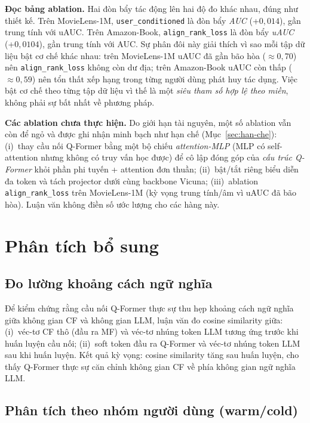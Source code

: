 \textbf{Đọc bảng ablation.} Hai đòn bẩy tác động lên hai độ đo khác nhau, đúng như thiết kế.
Trên MovieLens-1M, \texttt{user\_conditioned} là đòn bẩy \textit{AUC} (+$0{,}014$), gần trung
tính với uAUC. Trên Amazon-Book, \texttt{align\_rank\_loss} là đòn bẩy \textit{uAUC}
(+$0{,}0104$), gần trung tính với AUC. Sự phân đôi này giải thích vì sao mỗi tập dữ liệu bật
cơ chế khác nhau: trên MovieLens-1M uAUC đã gần bão hòa ($\approx 0{,}70$) nên
\texttt{align\_rank\_loss} không còn dư địa; trên Amazon-Book uAUC còn thấp ($\approx 0{,}59$)
nên tổn thất xếp hạng trong từng người dùng phát huy tác dụng. Việc bật cơ chế theo từng tập dữ
liệu vì thế là một \textit{siêu tham số hợp lệ theo miền}, không phải sự bất nhất về
phương pháp.

\textbf{Các ablation chưa thực hiện.} Do giới hạn tài nguyên, một số ablation vẫn còn để
ngỏ và được ghi nhận minh bạch như hạn chế (Mục~\ref{sec:han-che}): (i)~thay cầu nối Q-Former
bằng một bộ chiếu \textit{attention-MLP} (MLP có self-attention nhưng không có truy vấn học
được) để cô lập đóng góp của \textit{cấu trúc Q-Former} khỏi phần phi tuyến + attention đơn
thuần; (ii)~bật/tắt riêng biểu diễn đa token và tách projector dưới cùng backbone Vicuna;
(iii)~ablation \texttt{align\_rank\_loss} trên MovieLens-1M (kỳ
vọng trung tính/âm vì uAUC đã bão hòa). Luận văn không điền số ước lượng cho các hàng này.

\section{Phân tích bổ sung}
\label{sec:phan-tich-bo-sung}

\subsection{Đo lường khoảng cách ngữ nghĩa}
\label{ssec:cosine-sim}

Để kiểm chứng rằng cầu nối Q-Former thực sự thu hẹp khoảng cách ngữ nghĩa giữa không
gian CF và không gian LLM, luận văn đo cosine similarity giữa:
(i)~véc-tơ CF thô (đầu ra MF) và véc-tơ nhúng token LLM tương ứng trước khi huấn luyện
cầu nối; (ii)~soft token đầu ra Q-Former và véc-tơ nhúng token LLM sau khi huấn luyện.
Kết quả kỳ vọng: cosine similarity tăng sau huấn luyện, cho thấy Q-Former thực sự căn
chỉnh không gian CF về phía không gian ngữ nghĩa LLM.

\subsection{Phân tích theo nhóm người dùng (warm/cold)}
\label{ssec:user-group}

